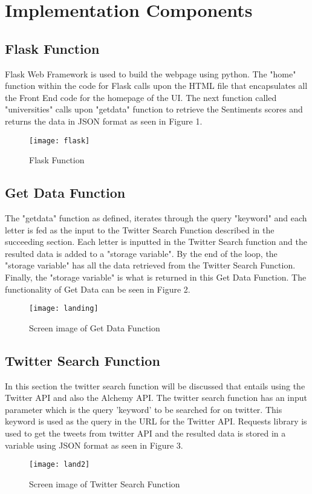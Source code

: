 \documentclass[12pt, titlepage]{article}
\begin{document}
\newpage
\section{Implementation Components}
\subsection{Flask Function}
Flask Web Framework is used to build the webpage using python. The "home" function within the code for Flask calls upon the HTML file that encapsulates all the Front End code for the homepage of the UI. 
The next function called "universities" calls upon "getdata" function to retrieve the Sentiments scores and returns the data in JSON format as seen in Figure 1.
\begin{figure}[H]
\centering
\texttt{[image: flask]}
\caption{Flask Function}
\label{fig:flask}
\end{figure}
\subsection{Get Data Function}
The "getdata" function as defined, iterates through the query "keyword" and each letter is fed as the input to the Twitter Search Function described in the succeeding section. Each letter is inputted in the Twitter Search function and the resulted data is added to a "storage variable". By the end of the loop, the "storage variable" has all the data retrieved from the Twitter Search Function. Finally, the "storage variable" is what is returned in this Get Data Function. The functionality of Get Data can be seen in Figure 2.

\begin{figure}[H]
\centering
\texttt{[image: landing]}
\caption{Screen image of Get Data Function}
\label{fig:GetData}
\end{figure}


\subsection{Twitter Search Function}
In this section the twitter search function will be discussed that entails using the Twitter API and also the Alchemy API. The twitter search function has an input parameter which is the query 'keyword' to be searched for on twitter. This keyword is used as the query in the URL for the Twitter API. Requests library is used to get the tweets from twitter API and the resulted data is stored in a variable using JSON format as seen in Figure 3. 
\begin{figure}[H]
\centering
\texttt{[image: land2]}
\caption{Screen image of Twitter Search Function}
\label{fig:TwitterSearch}
\end{figure}
\end{document}
